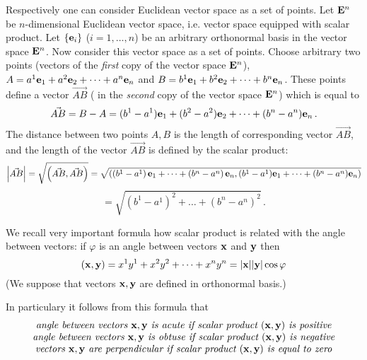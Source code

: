 \documentclass[12pt]{article}
\numberwithin{equation}{section}
\begin{document}
    Respectively one can consider Euclidean vector space
as a set of points.  Let ${\bf E}^n$ be $n$-dimensional
Euclidean vector space, i.e. 
 vector space equipped with scalar product.
 Let  $\{{\bf e}_i\}$ ($i=1,\dots,n$) 
be an arbitrary orthonormal basis in the vector space ${\bf E}^n$.
  Now consider this vector space as a set of points.
 Choose arbitrary two points (vectors of the {\it first} 
copy of
the vector space ${\bf E}^n$),
$A=a^1{\bf e}_1+a^2{\bf e}_2+\dots+a^n{\bf e}_n$  and 
$B=b^1{\bf e}_1+b^2{\bf e}_2+\dots+b^n{\bf e}_n$.   
These points define a vector
$\vec{AB}$ ( in the {\it second} copy of the
vector space ${\bf E}^n$)  which is equal to  
     \begin{equation*}
\vec{AB}=B-A=
(b^1-a^1){\bf e}_1+
(b^2-a^2){\bf e}_2+\dots+
(b^n-a^n){\bf e}_n\,.
      \end{equation*}
The distance between two points
  $A,B$  is
    the length of corresponding vector $\vec{AB}$,
and the length of the vector $\vec{AB}$ is defined
by the scalar product:
           $$
\left|\vec{AB}\right|=
  \sqrt{\left(\vec {AB},\vec{AB}\right)}=
      \sqrt
         {
       \left(
\left(b^1-a^1\right){\bf e}_1+\dots+
\left(b^n-a^n\right){\bf e}_n,
(b^1-a^1){\bf e}_1+\dots+(b^n-a^n){\bf e}_n
        \right)
          }
           $$
\begin{equation*}\label{distance}
      =\sqrt {\left(b^1-a^1\right)^2
 +\dots+\left(b^{n}-a^n\right)^2}\,.
\end{equation*}

We recall very important formula how scalar product is
related with the angle between vectors:
if  $\varphi$ is an angle between vectors ${\bf x}$ 
and ${\bf y}$ then
\begin{equation}\label{scalarproductandangleinndimensions}
  ({\bf x},{\bf y})=
x^1y^1+x^2y^2+\dots+x^ny^n=|{\bf x}||{\bf y}|\cos\varphi
\end{equation}
(We suppose that vectors ${\bf x},{\bf y}$ are defined in orthonormal
basis.)

In particulary it follows from this formula
 that
                \begin{equation}\label{angleacuteorobtuse}
                \begin {array}{cc}
 \hbox {\it angle between vectors ${\bf x},{\bf y}$ is acute  if scalar product $({\bf x},{\bf y})$ is positive}\\
\hbox {\it angle between vectors ${\bf x},{\bf y}$ is obtuse  if scalar product $({\bf x},{\bf y})$ is negative}\\
\hbox {\it vectors ${\bf x},{\bf y}$ are perpendicular  if scalar product $({\bf x},{\bf y})$ is equal to zero}
          \end{array}
          \end{equation}
\end{document}

